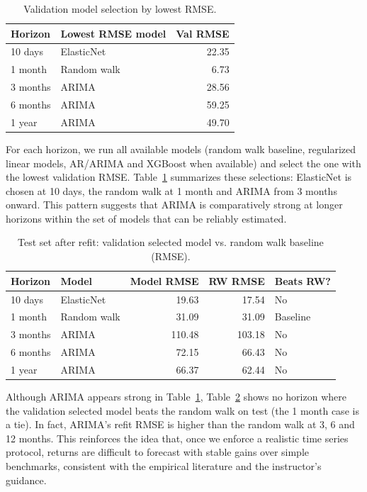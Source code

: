 \documentclass[11pt,a4paper]{article}
\begin{document}
\begin{table}[H]
\centering
\footnotesize
\setlength{\tabcolsep}{4pt}
\renewcommand{\arraystretch}{1.0}
\caption{Validation model selection by lowest RMSE.}
\label{tab:rmse-validation}
\begin{tabular}{l l r}
\toprule
Horizon & Lowest RMSE model & Val RMSE \\
\midrule
10 days  & ElasticNet & 22.35 \\
1 month  & Random walk & 6.73 \\
3 months & ARIMA & 28.56 \\
6 months & ARIMA & 59.25 \\
1 year   & ARIMA & 49.70 \\
\bottomrule
\end{tabular}
\end{table}

\noindent For each horizon, we run all available models (random walk baseline, regularized linear models, AR/ARIMA and XGBoost when available) and select the one with the lowest validation RMSE. Table~\ref{tab:rmse-validation} summarizes these selections: ElasticNet is chosen at 10 days, the random walk at 1 month and ARIMA from 3 months onward. This pattern suggests that ARIMA is comparatively strong at longer horizons within the set of models that can be reliably estimated.

\begin{table}[H]
\centering
\footnotesize
\setlength{\tabcolsep}{4pt}
\renewcommand{\arraystretch}{1.0}
\caption{Test set after refit: validation selected model vs. random walk baseline (RMSE).}
\label{tab:rmse-test}
\begin{tabular}{l l r r l}
\toprule
Horizon & Model & Model RMSE & RW RMSE & Beats RW? \\
\midrule
10 days  & ElasticNet & 19.63 & 17.54 & No \\
1 month  & Random walk & 31.09 & 31.09 & Baseline \\
3 months & ARIMA & 110.48 & 103.18 & No \\
6 months & ARIMA & 72.15 & 66.43 & No \\
1 year   & ARIMA & 66.37 & 62.44 & No \\
\bottomrule
\end{tabular}
\end{table}

\noindent Although ARIMA appears strong in Table~\ref{tab:rmse-validation}, Table~\ref{tab:rmse-test} shows no horizon where the validation selected model beats the random walk on test (the 1 month case is a tie). In fact, ARIMA’s refit RMSE is higher than the random walk at 3, 6 and 12 months. This reinforces the idea that, once we enforce a realistic time series protocol, returns are difficult to forecast with stable gains over simple benchmarks, consistent with the empirical literature and the instructor’s guidance.
\end{document}
